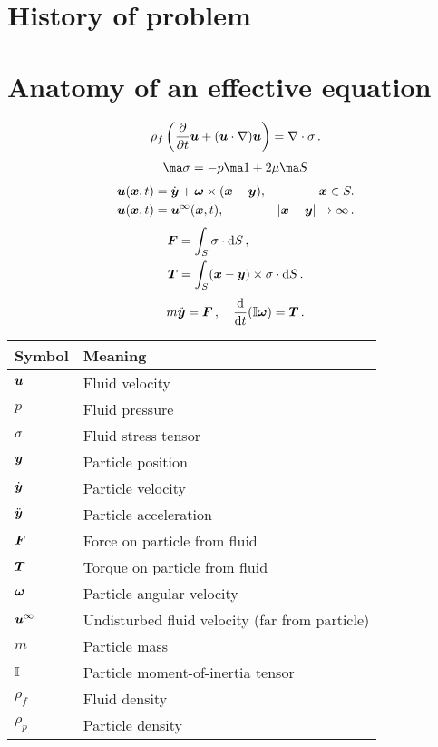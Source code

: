 \documentclass[thesis.tex]{subfiles}
\begin{document}
\section{History of problem}

\section{Anatomy of an effective equation}

\begin{align}
    \rho_f \left(\frac{\partial }{\partial t}\mbox{\boldmath$u$} + (\mbox{\boldmath$u$} \cdot \nabla) \mbox{\boldmath$u$}\right)=\nabla \cdot \mathbb{\sigma}\,.
\end{align}
\begin{align}
    \ma \sigma = -p \ma 1 + 2\mu \ma S
\end{align}
\begin{align}
    \mbox{\boldmath$u$}(\mbox{\boldmath$x$}, t) &= \dot{\mbox{\boldmath$y$}} + \mbox{\boldmath$\omega$} \times (\mbox{\boldmath$x$} - \mbox{\boldmath$y$}), & \mbox{\boldmath$x$} \in S. \nonumber\\
    \mbox{\boldmath$u$}(\mbox{\boldmath$x$}, t) &= \mbox{\boldmath$u$}^\infty(\mbox{\boldmath$x$}, t), & |\mbox{\boldmath$x$}-\mbox{\boldmath$y$}|\to\infty\,.
\end{align}
\begin{align}
    \mbox{\boldmath$F$} &= \int_S \mathbb{\sigma} \cdot \mathrm{d} S\,, \\
    \mbox{\boldmath$T$} &= \int_S (\mbox{\boldmath$x$} - \mbox{\boldmath$y$}) \times \mathbb{\sigma} \cdot \mathrm{d} S\,.
\end{align}
\begin{align}
    m\ddot{\mbox{\boldmath$y$}} = \mbox{\boldmath$F$}\,, \quad \frac{\mathrm{d} }{\mathrm{d} t}(\mathbb{I} \mbox{\boldmath$\omega$}) = \mbox{\boldmath$T$}\,.
\end{align}

\begin{table}
    \begin{tabular}{ll}
    \toprule
    Symbol & Meaning \\
    \midrule
    $\mbox{\boldmath$u$}$      & Fluid velocity       \\
    $p$      & Fluid pressure       \\
    $\mathbb{\sigma}$      & Fluid stress tensor       \\
    $\mbox{\boldmath$y$}$      & Particle position       \\
    $\dot{\mbox{\boldmath$y$}}$      & Particle velocity       \\
    $\ddot{\mbox{\boldmath$y$}}$      & Particle acceleration       \\
    $\mbox{\boldmath$F$}$      & Force on particle from fluid       \\
    $\mbox{\boldmath$T$}$      & Torque on particle from fluid       \\
    $\mbox{\boldmath$\omega$}$      & Particle angular velocity       \\
    $\mbox{\boldmath$u$}^\infty$      & Undisturbed fluid velocity (far from particle)       \\
    $m$      & Particle mass       \\
    $\mathbb{I}$ & Particle moment-of-inertia tensor \\
    $\rho_f$      & Fluid density       \\
    $\rho_p$      & Particle density       \\
    \bottomrule
    \end{tabular}
\end{table}
\end{document}
